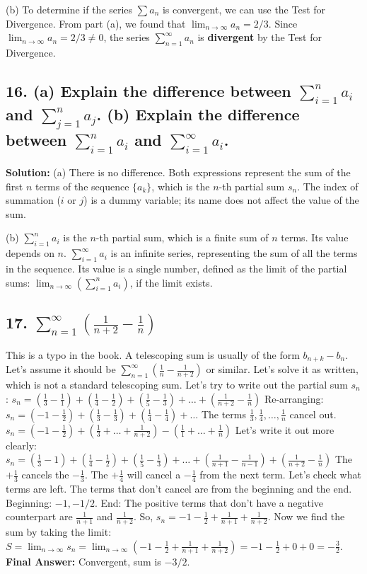 \documentclass{article}
\begin{document}
(b) To determine if the series $\sum a_n$ is convergent, we can use the Test for Divergence.
From part (a), we found that $\lim_{n \to \infty} a_n = 2/3$.
Since $\lim_{n \to \infty} a_n = 2/3 \neq 0$, the series $\sum_{n=1}^{\infty} a_n$ is \textbf{divergent} by the Test for Divergence.

\subsection*{16. (a) Explain the difference between $\sum_{i=1}^{n} a_i$ and $\sum_{j=1}^{n} a_j$. (b) Explain the difference between $\sum_{i=1}^{n} a_i$ and $\sum_{i=1}^{\infty} a_i$.}
\textbf{Solution:}
(a) There is no difference. Both expressions represent the sum of the first $n$ terms of the sequence $\{a_k\}$, which is the $n$-th partial sum $s_n$. The index of summation ($i$ or $j$) is a dummy variable; its name does not affect the value of the sum.

(b) $\sum_{i=1}^{n} a_i$ is the $n$-th partial sum, which is a finite sum of $n$ terms. Its value depends on $n$. $\sum_{i=1}^{\infty} a_i$ is an infinite series, representing the sum of all the terms in the sequence. Its value is a single number, defined as the limit of the partial sums: $\lim_{n \to \infty} \left(\sum_{i=1}^{n} a_i\right)$, if the limit exists.

\subsection*{17. $\sum_{n=1}^{\infty} \left( \frac{1}{n+2} - \frac{1}{n} \right)$}
This is a typo in the book. A telescoping sum is usually of the form $b_{n+k} - b_n$. Let's assume it should be $\sum_{n=1}^{\infty} \left( \frac{1}{n} - \frac{1}{n+2} \right)$ or similar. Let's solve it as written, which is not a standard telescoping sum.
Let's try to write out the partial sum $s_n$:
$s_n = \left(\frac{1}{3} - \frac{1}{1}\right) + \left(\frac{1}{4} - \frac{1}{2}\right) + \left(\frac{1}{5} - \frac{1}{3}\right) + \dots + \left(\frac{1}{n+2} - \frac{1}{n}\right)$
Re-arranging:
$s_n = (-1 - \frac{1}{2}) + (\frac{1}{3} - \frac{1}{3}) + (\frac{1}{4} - \frac{1}{4}) + \dots$
The terms $\frac{1}{3}, \frac{1}{4}, \dots, \frac{1}{n}$ cancel out.
$s_n = (-1 - \frac{1}{2}) + (\frac{1}{3}+\dots+\frac{1}{n+2}) - (\frac{1}{1}+\dots+\frac{1}{n}) $
Let's write it out more clearly:
$s_n = (\frac{1}{3}-1) + (\frac{1}{4}-\frac{1}{2}) + (\frac{1}{5}-\frac{1}{3}) + \dots + (\frac{1}{n+1}-\frac{1}{n-1}) + (\frac{1}{n+2}-\frac{1}{n})$
The $+\frac{1}{3}$ cancels the $-\frac{1}{3}$. The $+\frac{1}{4}$ will cancel a $-\frac{1}{4}$ from the next term.
Let's check what terms are left.
The terms that don't cancel are from the beginning and the end.
Beginning: $-1, -1/2$.
End: The positive terms that don't have a negative counterpart are $\frac{1}{n+1}$ and $\frac{1}{n+2}$.
So, $s_n = -1 - \frac{1}{2} + \frac{1}{n+1} + \frac{1}{n+2}$.
Now we find the sum by taking the limit:
$S = \lim_{n \to \infty} s_n = \lim_{n \to \infty} \left( -1 - \frac{1}{2} + \frac{1}{n+1} + \frac{1}{n+2} \right) = -1 - \frac{1}{2} + 0 + 0 = -\frac{3}{2}$.
\textbf{Final Answer:} Convergent, sum is $-3/2$.
\end{document}

